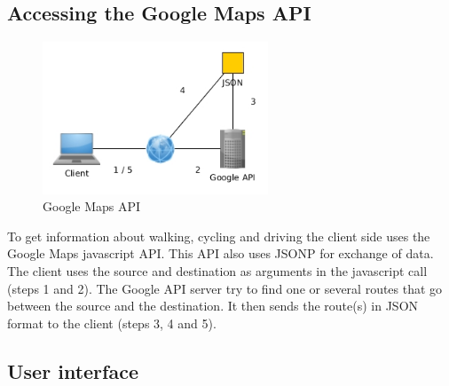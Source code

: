 \documentclass[10pt,a4paper]{article}
\begin{document}
\subsection{Accessing the Google Maps API}
\label{sec:access-google-maps}
\begin{figure}
\centering
\includegraphics[width=0.6\textwidth]{../google/access}
\caption{Google Maps API}
\label{fig:google}
\end{figure}
To get information about walking, cycling and driving the client side uses the Google Maps javascript API. This API also uses JSONP for exchange of data. The client uses the source and destination as arguments in the javascript call (steps 1 and 2). The Google API server try to find one or several routes that go between the source and the destination. It then sends the route(s) in JSON format to the client (steps 3, 4 and 5).



\subsection{User interface}
\label{sec:user_inter}
\end{document}
